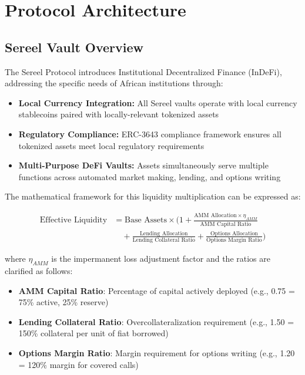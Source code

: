 \documentclass[12pt]{article}
\begin{document}
\section{Protocol Architecture}
\subsection{Sereel Vault Overview}
The Sereel Protocol introduces Institutional Decentralized Finance (InDeFi), addressing the specific needs of African institutions through:

\begin{itemize}
  \item \textbf{Local Currency Integration:} All Sereel vaults operate with local currency stablecoins paired with locally-relevant tokenized assets
  \item \textbf{Regulatory Compliance:} ERC-3643 compliance framework ensures all tokenized assets meet local regulatory requirements
  \item \textbf{Multi-Purpose DeFi Vaults:} Assets simultaneously serve multiple functions across automated market making, lending, and options writing
\end{itemize}

The mathematical framework for this liquidity multiplication can be expressed as:

\begin{align}
\text{Effective Liquidity} &= \text{Base Assets} \times \Bigg(1 + \frac{\text{AMM Allocation} \times \eta_{AMM}}{\text{AMM Capital Ratio}} \nonumber\\
&\quad + \frac{\text{Lending Allocation}}{\text{Lending Collateral Ratio}} + \frac{\text{Options Allocation}}{\text{Options Margin Ratio}}\Bigg)
\end{align}

where $\eta_{AMM}$ is the impermanent loss adjustment factor and the ratios are clarified as follows:
\begin{itemize}
\item \textbf{AMM Capital Ratio}: Percentage of capital actively deployed (e.g., 0.75 = 75\% active, 25\% reserve)
\item \textbf{Lending Collateral Ratio}: Overcollateralization requirement (e.g., 1.50 = 150\% collateral per unit of fiat borrowed)
\item \textbf{Options Margin Ratio}: Margin requirement for options writing (e.g., 1.20 = 120\% margin for covered calls)
\end{itemize}
\end{document}
